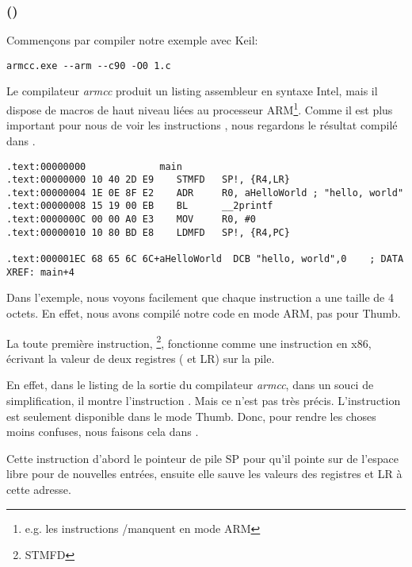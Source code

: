 \subsubsection{\NonOptimizingKeilVI (\ARMMode)}

Commençons par compiler notre exemple avec Keil:

\begin{lstlisting}
armcc.exe --arm --c90 -O0 1.c 
\end{lstlisting}

\myindex{\IntelSyntax}
Le compilateur \emph{armcc} produit un listing assembleur en syntaxe Intel, mais il dispose de macros
de haut niveau liées au processeur ARM\footnote{e.g. les instructions \PUSH/\POP manquent en mode
ARM}. Comme il est plus important pour nous de voir les instructions , nous
regardons le résultat compilé dans \IDA.

\begin{lstlisting}[caption=\NonOptimizingKeilVI (\ARMMode) \IDA,style=customasmARM]
.text:00000000             main
.text:00000000 10 40 2D E9    STMFD   SP!, {R4,LR}
.text:00000004 1E 0E 8F E2    ADR     R0, aHelloWorld ; "hello, world"
.text:00000008 15 19 00 EB    BL      __2printf
.text:0000000C 00 00 A0 E3    MOV     R0, #0
.text:00000010 10 80 BD E8    LDMFD   SP!, {R4,PC}

.text:000001EC 68 65 6C 6C+aHelloWorld  DCB "hello, world",0    ; DATA XREF: main+4
\end{lstlisting}

Dans l'exemple, nous voyons facilement que chaque instruction a une taille de 4 octets.
En effet, nous avons compilé notre code en mode ARM, pas pour Thumb.

La toute première instruction, \footnote{\ac{STMFD}},
fonctionne comme une instruction \PUSH en x86, écrivant la valeur de deux registres
( et \ac{LR}) sur la pile.

En effet, dans le listing de la sortie du compilateur \emph{armcc}, dans un souci
de simplification, il montre l'instruction .
Mais ce n'est pas très précis. L'instruction \PUSH est seulement disponible dans
le mode Thumb.  Donc, pour rendre les choses moins confuses, nous faisons cela
dans \IDA.

Cette instruction  d'abord le pointeur de pile \ac{SP}
pour qu'il pointe sur de l'espace libre pour de nouvelles entrées, ensuite elle
sauve les valeurs des registres  et \ac{LR} à cette adresse.

